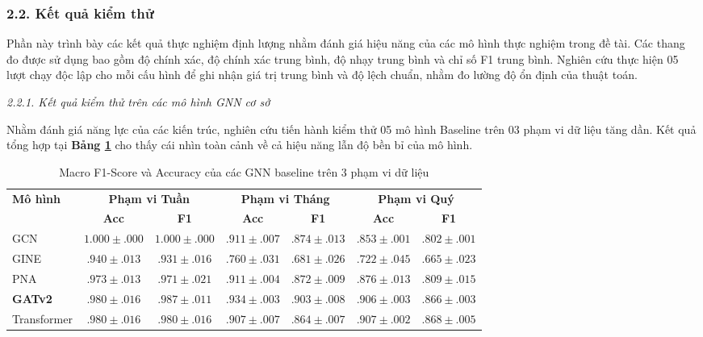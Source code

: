 \subsubsection{2.2. Kết quả kiểm thử}

\indent\indent Phần này trình bày các kết quả thực nghiệm định lượng nhằm đánh giá hiệu năng của các mô hình thực nghiệm trong đề tài. Các thang đo được sử dụng bao gồm độ chính xác, độ chính xác trung bình, độ nhạy trung bình và chỉ số F1 trung bình. Nghiên cứu thực hiện 05 lượt chạy độc lập cho mỗi cấu hình để ghi nhận giá trị trung bình và độ lệch chuẩn, nhằm đo lường độ ổn định của thuật toán.\vspace{0.3cm}

\textit{2.2.1. Kết quả kiểm thử trên các mô hình GNN cơ sở}\vspace{0.2cm}

Nhằm đánh giá năng lực của các kiến trúc, nghiên cứu tiến hành kiểm thử 05 mô hình Baseline trên 03 phạm vi dữ liệu tăng dần. Kết quả tổng hợp tại \textbf{Bảng \ref{tab:TemporalGNN}} cho thấy cái nhìn toàn cảnh về cả hiệu năng lẫn độ bền bỉ của mô hình.

\begin{table}[H]
    \centering
    \renewcommand{\arraystretch}{1.2}
    \setlength{\tabcolsep}{3pt}
    \caption{Macro F1-Score và Accuracy của các GNN baseline trên 3 phạm vi dữ liệu}
    \label{tab:TemporalGNN}
    \begin{tabular}{lcccccc}
        \hline
        \multirow{2}{*}{\textbf{Mô hình}} & \multicolumn{2}{c}{\textbf{Phạm vi Tuần}} & \multicolumn{2}{c}{\textbf{Phạm vi Tháng}} & \multicolumn{2}{c}{\textbf{Phạm vi Quý}} \\ \cline{2-7} 
        & \textbf{Acc} & \textbf{F1} & \textbf{Acc} & \textbf{F1} & \textbf{Acc} & \textbf{F1} \\ 
        \hline
        GCN          & $1.000 \pm .000$ & $1.000 \pm .000$ & $.911 \pm .007$ & $.874 \pm .013$ & $.853 \pm .001$ & $.802 \pm .001$ \\
        GINE         & $.940 \pm .013$ & $.931 \pm .016$ & $.760 \pm .031$ & $.681 \pm .026$ & $.722 \pm .045$ & $.665 \pm .023$ \\
        PNA          & $.973 \pm .013$ & $.971 \pm .021$ & $.911 \pm .004$ & $.872 \pm .009$ & $.876 \pm .013$ & $.809 \pm .015$ \\
        \textbf{GATv2} & $.980 \pm .016$ & $.987 \pm .011$ & $\mathbf{.934 \pm .003}$ & $\mathbf{.903 \pm .008}$ & $.906 \pm .003$ & $.866 \pm .003$ \\
        Transformer  & $.980 \pm .016$ & $.980 \pm .016$ & $.907 \pm .007$ & $.864 \pm .007$ & $\mathbf{.907 \pm .002}$ & $\mathbf{.868 \pm .005}$ \\
        \hline
    \end{tabular}
\end{table}

